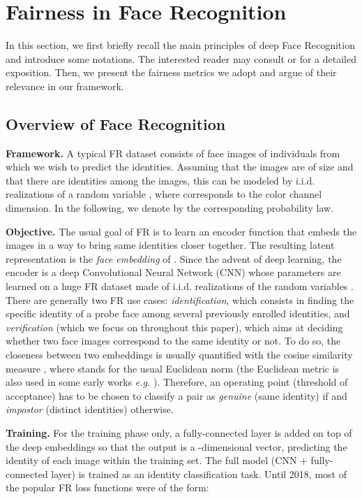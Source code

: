 \documentclass[nohyperref]{article}
\theoremstyle{plain}
\theoremstyle{definition}
\theoremstyle{remark}
\begin{document}
 
\section{Fairness in Face Recognition}

In this section, we first briefly recall the main principles of deep Face Recognition and introduce some notations. The interested reader may consult \cite{survey_FR} or \cite{survey_FR2} for a detailed exposition. Then, we present the fairness metrics we adopt and argue of their relevance in our framework.

\subsection{Overview of Face Recognition}\label{subsec:FR_survey}

{\bf Framework.} A typical FR dataset consists of face images of individuals from which we wish to predict the identities. Assuming that the images are of size  and that there are  identities among the images, this can be modeled by i.i.d. realizations of a random variable , where  corresponds to the color channel dimension. In the following, we denote by  the corresponding probability law.

{\bf Objective.} The usual goal of FR is to learn an encoder function  that embeds the images in a way to bring same identities closer together. The resulting latent representation  is the {\it face embedding} of . Since the advent of deep learning, the encoder is a deep Convolutional Neural Network (CNN) whose parameters  are learned on a huge FR dataset  made of  i.i.d. realizations of the random variables . There are generally two FR use cases: {\it identification}, which consists in finding the specific identity of a probe face among several previously enrolled identities, and {\it verification} (which we focus on throughout this paper), which aims at deciding whether two face images correspond to the same identity or not. To do so, the closeness between two embeddings is usually quantified with the cosine similarity measure , where  stands for the usual Euclidean norm (the Euclidean metric  is also used in some early works {\it e.g.} \cite{facenet}). Therefore, an operating point  (threshold of acceptance) has to be chosen to classify a pair  as {\it genuine} (same identity) if  and {\it impostor} (distinct identities) otherwise.

{\bf Training.} For the training phase only, a fully-connected layer is added on top of the deep embeddings so that the output is a -dimensional vector, predicting the identity of each image within the training set. The full model (CNN + fully-connected layer) is trained as an identity classification task. Until 2018, most of the popular FR loss functions were of the form:
 
\end{document}
